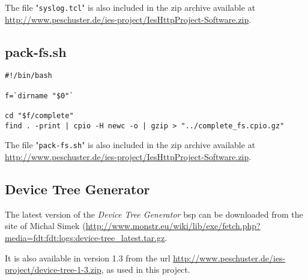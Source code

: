 The file "\texttt{syslog.tcl}" is also included in the zip archive available at \url{http://www.peschuster.de/ies-project/IesHttpProject-Software.zip}.

\subsection{pack-fs.sh}
\label{subsec:pack-fs}

\begin{verbatim}
#!/bin/bash

f=`dirname "$0"`

cd "$f/complete"
find . -print | cpio -H newc -o | gzip > "../complete_fs.cpio.gz"
\end{verbatim}

The file "\texttt{pack-fs.sh}" is also included in the zip archive available at \url{http://www.peschuster.de/ies-project/IesHttpProject-Software.zip}.

\subsection{Device Tree Generator}
\label{subsec:dts-generator}

The latest version of the \textit{Device Tree Generator} \gls{bsp} can be downloaded from the site of Michal Simek (\url{http://www.monstr.eu/wiki/lib/exe/fetch.php?media=fdt:fdt:logs:device-tree_latest.tar.gz}.

It is also available in version 1.3 from the url \url{http://www.peschuster.de/ies-project/device-tree-1-3.zip}, as used in this project.